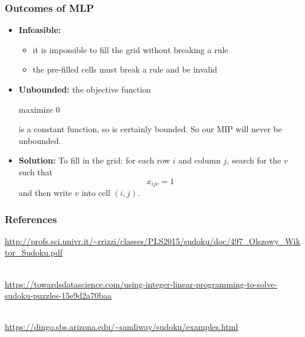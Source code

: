 \documentclass{beamer}
\newcommand{\stanza}{ \\~\ }
\begin{document}
\begin{frame} \frametitle{Outcomes of MLP}
  \begin{itemize}
  \item \textbf{Infeasible:}
    \begin{itemize}
    \item it is impossible to fill the grid without breaking a rule
    \item the pre-filled cells must break a rule and be invalid
    \end{itemize}
  \item \textbf{Unbounded:} the objective function

    maximize 0

    is a constant function, so is certainly bounded. So our MIP will
    never be unbounded.

  \item \textbf{Solution:} To fill in the grid: for each row $i$ and
    column $j$, search for the $v$ such that
    \[ x_{ijv}=1 \]
    and then write $v$ into cell $(i, j).$

  \end{itemize}
\end{frame}

\begin{frame} \frametitle{References}
  \url{http://profs.sci.univr.it/~rrizzi/classes/PLS2015/sudoku/doc/497_Olszowy_Wiktor_Sudoku.pdf}
  \stanza

  \url{https://towardsdatascience.com/using-integer-linear-programming-to-solve-sudoku-puzzles-15e9d2a70baa}
  \stanza

  \url{https://dingo.sbs.arizona.edu/~sandiway/sudoku/examples.html}
\end{frame}
\end{document}
